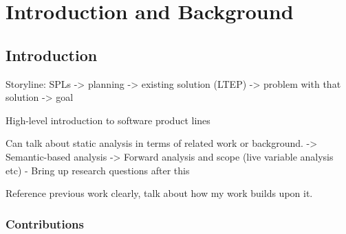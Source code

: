 \part{Introduction and Background}

\chapter{Introduction}

Storyline: SPLs -> planning -> existing solution (LTEP) -> problem with that solution -> goal

High-level introduction to software product lines

Can talk about static analysis in terms of related work or background.
-> Semantic-based analysis
-> Forward analysis and scope (live variable analysis etc)
- Bring up research questions after this

Reference previous work clearly, talk about how my work builds upon it.

\section{Contributions}



